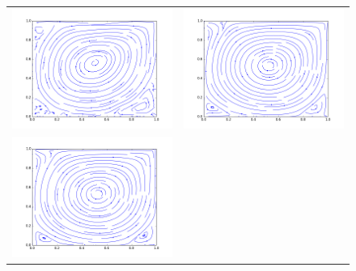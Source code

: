 \begin{figure}
	\centering
	\begin{tabulary}{\linewidth}{c c}
		\includegraphics[width=\figwid]{figs/lid/power_bgk-filter_100_n0.5_Re1000/sl_step-000050000}
		&
		\includegraphics[width=\figwid]{figs/lid/power_mrt_100_n0.5_Re1000/sl_step-000050000}
		\\
		\includegraphics[width=\figwid]{figs/lid/power_mrt-filter_100_n0.5_Re1000/sl_step-000050000}

\end{tabulary}
\end{figure}
